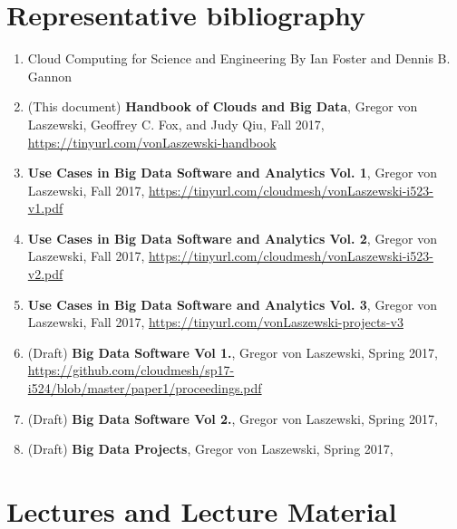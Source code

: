 \section{Representative bibliography}

\begin{enumerate}

\item Cloud Computing for Science and Engineering By Ian Foster and
  Dennis
  B. Gannon


\item (This document) {\bf Handbook of Clouds and Big Data}, Gregor von Laszewski,
  Geoffrey C. Fox, and Judy Qiu, Fall 2017,
  \url{https://tinyurl.com/vonLaszewski-handbook}

\item {\bf Use Cases in Big Data Software and
  Analytics Vol. 1}, Gregor von Laszewski, Fall 2017,
  \url{https://tinyurl.com/cloudmesh/vonLaszewski-i523-v1.pdf}

\item {\bf Use Cases in Big Data Software and
  Analytics Vol. 2}, Gregor von Laszewski, Fall 2017, \url{https://tinyurl.com/cloudmesh/vonLaszewski-i523-v2.pdf}

\item  {\bf Use Cases in Big Data Software and
  Analytics Vol. 3}, Gregor von Laszewski, Fall 2017, 
  \url{https://tinyurl.com/vonLaszewski-projects-v3}


\item (Draft) {\bf Big Data Software Vol 1.}, Gregor von Laszewski, Spring 2017,
\url{https://github.com/cloudmesh/sp17-i524/blob/master/paper1/proceedings.pdf}

\item (Draft) {\bf Big Data Software Vol 2.}, Gregor von Laszewski, Spring 2017,

\item (Draft) {\bf Big Data Projects}, Gregor von Laszewski, Spring 2017,

\end{enumerate}

\section{Lectures and Lecture Material}


